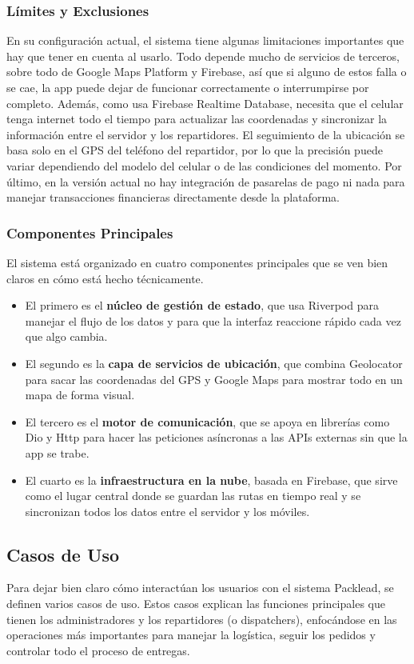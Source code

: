 \subsubsection{Límites y Exclusiones}
En su configuración actual, el sistema tiene algunas limitaciones importantes que hay que tener en cuenta al usarlo. Todo depende mucho de servicios de terceros, sobre todo de Google Maps Platform y Firebase, así que si alguno de estos falla o se cae, la app puede dejar de funcionar correctamente o interrumpirse por completo.
Además, como usa Firebase Realtime Database, necesita que el celular tenga internet todo el tiempo para actualizar las coordenadas y sincronizar la información entre el servidor y los repartidores. El seguimiento de la ubicación se basa solo en el GPS del teléfono del repartidor, por lo que la precisión puede variar dependiendo del modelo del celular o de las condiciones del momento. Por último, en la versión actual no hay integración de pasarelas de pago ni nada para manejar transacciones financieras directamente desde la plataforma.

\subsubsection{Componentes Principales}
El sistema está organizado en cuatro componentes principales que se ven bien claros en cómo está hecho técnicamente.

\begin{itemize}
    \item El primero es el \textbf{núcleo de gestión de estado}, que usa Riverpod para manejar el flujo de los datos y para que la interfaz reaccione rápido cada vez que algo cambia.
    \item El segundo es la \textbf{capa de servicios de ubicación}, que combina Geolocator para sacar las coordenadas del GPS y Google Maps para mostrar todo en un mapa de forma visual.
    \item El tercero es el \textbf{motor de comunicación}, que se apoya en librerías como Dio y Http para hacer las peticiones asíncronas a las APIs externas sin que la app se trabe.
    \item El cuarto es la \textbf{infraestructura en la nube}, basada en Firebase, que sirve como el lugar central donde se guardan las rutas en tiempo real y se sincronizan todos los datos entre el servidor y los móviles.
\end{itemize}

\subsection{Casos de Uso}
Para dejar bien claro cómo interactúan los usuarios con el sistema Packlead, se definen varios casos de uso. Estos casos explican las funciones principales que tienen los administradores y los repartidores (o dispatchers), enfocándose en las operaciones más importantes para manejar la logística, seguir los pedidos y controlar todo el proceso de entregas.

